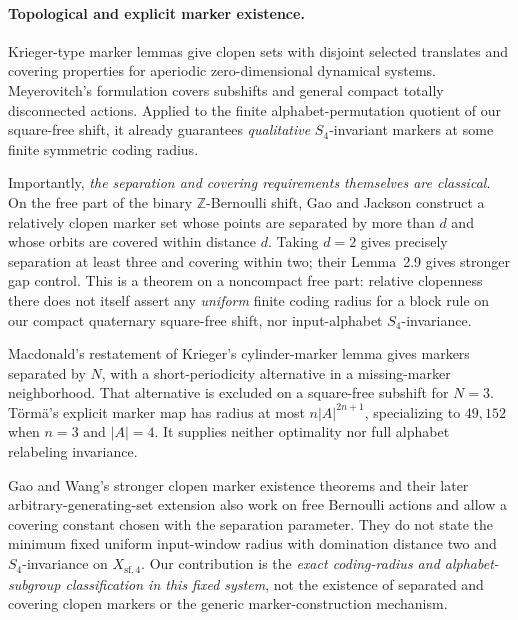 \documentclass[11pt]{article}
\theoremstyle{remark}
\newcommand{\Xsf}{X_{\mathrm{sf},4}}
\begin{document}
\paragraph{Topological and explicit marker existence.}
Krieger-type marker lemmas give clopen sets with disjoint selected
translates and covering properties for aperiodic zero-dimensional
dynamical systems. Meyerovitch's
\cite[Lemmas~3.3--3.4]{meyerovitch2025embedding}
formulation covers subshifts and general compact totally
disconnected actions. Applied to the finite alphabet-permutation
quotient of our square-free shift, it already guarantees
\emph{qualitative} $S_4$-invariant markers at some finite
symmetric coding radius.

Importantly, \emph{the separation and covering requirements
themselves are classical}. On the free part of the binary
$\mathbb Z$-Bernoulli shift, Gao and Jackson
\cite[Lemma~2.1]{gaojackson2015markers}
construct a relatively clopen marker set whose points are
separated by more than $d$ and whose orbits are covered
within distance $d$. Taking $d=2$ gives precisely
separation at least three and covering within two;
their Lemma~2.9 gives stronger gap control.
This is a theorem on a noncompact free part: relative
clopenness there does not itself assert any \emph{uniform}
finite coding radius for a block rule on our compact
quaternary square-free shift, nor input-alphabet
$S_4$-invariance.

Macdonald's restatement of Krieger's cylinder-marker
lemma \cite[Lemma~2.6]{macdonald2024encoding}
gives markers separated by $N$, with a short-periodicity
alternative in a missing-marker neighborhood.
That alternative is excluded on a square-free subshift
for $N=3$. T{\"o}rm{\"a}'s explicit marker map
\cite[Lemma~6.10]{torma2015structural}
has radius at most $n|A|^{2n+1}$, specializing to
$49{,}152$ when $n=3$ and $|A|=4$.
It supplies neither optimality nor full alphabet
relabeling invariance.

Gao and Wang's stronger clopen marker existence theorems
\cite[Theorems~1.2--1.3]{gao2026markers}
and their later arbitrary-generating-set extension
\cite[Theorem~1.2]{gaowang2026arbitrary}
also work on free Bernoulli actions and allow a
covering constant chosen with the separation parameter.
They do not state the minimum fixed uniform input-window
radius with domination distance two and $S_4$-invariance
on $\Xsf$. Our contribution is the \emph{exact coding-radius
and alphabet-subgroup classification in this fixed system},
not the existence of separated and covering clopen
markers or the generic marker-construction mechanism.
\end{document}
